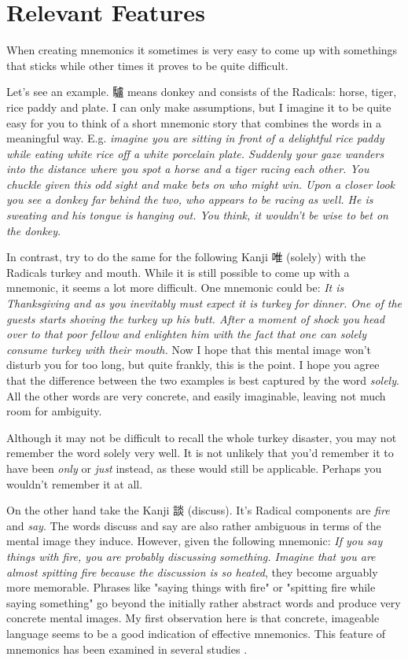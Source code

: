 \section{Relevant Features} \label{sec:body_relevant_features}
When creating mnemonics it sometimes is very easy to come up with somethings that sticks while other times it proves to be quite difficult.

Let's see an example. 驢 means donkey and consists of the Radicals: horse, tiger, rice paddy and plate. I can only make assumptions, but I imagine it to be quite easy for you to think of a short mnemonic story that combines the words in a meaningful way. E.g. \emph{imagine you are sitting in front of a delightful rice paddy while eating white rice off a white porcelain plate. Suddenly your gaze wanders into the distance where you spot a horse and a tiger racing each other. You chuckle given this odd sight and make bets on who might win. Upon a closer look you see a donkey far behind the two, who appears to be racing as well. He is sweating and his tongue is hanging out. You think, it wouldn't be wise to bet on the donkey}.

In contrast, try to do the same for the following Kanji 唯 (solely) with the Radicals turkey and mouth. While it is still possible to come up with a mnemonic, it seems a lot more difficult. One mnemonic could be: \emph{It is Thanksgiving and as you inevitably must expect it is turkey for dinner. One of the guests starts shoving the turkey up his butt.  After a moment of shock you head over to that poor fellow and  enlighten him with the fact that one can solely consume turkey with their mouth.} Now I hope that this mental image won't disturb you for too long, but quite frankly, this is the point. I hope you agree that the difference between the two examples is best captured by the word \emph{solely}. All the other words are very concrete, and easily imaginable, leaving not much room for ambiguity.

Although it may not be difficult to recall the whole turkey disaster, you may not remember the word solely very well. It is not unlikely that you'd remember it to have been \emph{only} or \emph{just} instead, as these would still be applicable. Perhaps you wouldn't remember it at all.

On the other hand take the Kanji 談 (discuss). It's Radical components are \emph{fire} and \emph{say}. The words discuss and say are also rather ambiguous in terms of the mental image they induce. However, given the following mnemonic: \emph{If you say things with fire, you are probably discussing something. Imagine that you are almost spitting fire because the discussion is so heated}, they become arguably more memorable. Phrases like "saying things with fire" or "spitting fire while saying something" go beyond the initially rather abstract words and produce very concrete mental images. My first observation here is that concrete, imageable language seems to be a good indication of effective mnemonics. This feature of mnemonics has been examined in  several studies \cite{campos_2004} \cite{campos_2011} \cite{kordjazi2014effect}.

